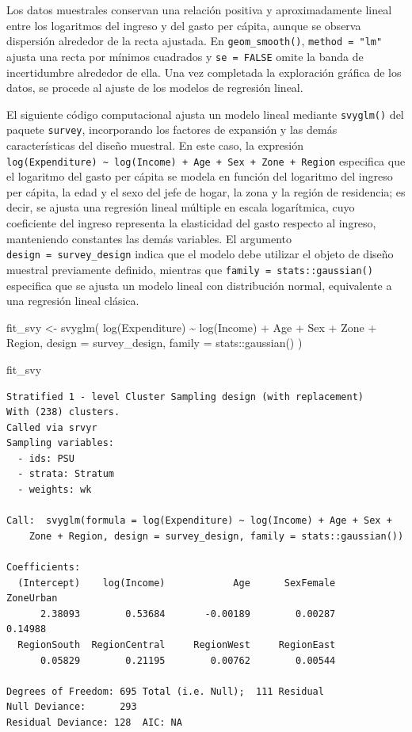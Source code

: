 \documentclass[
  spanish,
  11pt,
  letterpaper,
  oneside,
  open=any]{scrbook}
\newenvironment{Shaded}{\begin{snugshade}}{\end{snugshade}}
\newcommand{\AttributeTok}[1]{\textcolor[rgb]{0.40,0.45,0.13}{#1}}
\newcommand{\FunctionTok}[1]{\textcolor[rgb]{0.28,0.35,0.67}{#1}}
\newcommand{\NormalTok}[1]{\textcolor[rgb]{0.00,0.23,0.31}{#1}}
\newcommand{\OtherTok}[1]{\textcolor[rgb]{0.00,0.23,0.31}{#1}}
\newcommand{\SpecialCharTok}[1]{\textcolor[rgb]{0.37,0.37,0.37}{#1}}
\begin{document}
Los datos muestrales conservan una relación positiva y aproximadamente
lineal entre los logaritmos del ingreso y del gasto per cápita, aunque
se observa dispersión alrededor de la recta ajustada. En
\texttt{geom\_smooth()}, \texttt{method\ =\ "lm"} ajusta una recta por
mínimos cuadrados y \texttt{se\ =\ FALSE} omite la banda de
incertidumbre alrededor de ella. Una vez completada la exploración
gráfica de los datos, se procede al ajuste de los modelos de regresión
lineal.

El siguiente código computacional ajusta un modelo lineal mediante
\texttt{svyglm()} del paquete \texttt{survey}, incorporando los factores
de expansión y las demás características del diseño muestral. En este
caso, la expresión
\texttt{log(Expenditure)\ \textasciitilde{}\ log(Income)\ +\ Age\ +\ Sex\ +\ Zone\ +\ Region}
especifica que el logaritmo del gasto per cápita se modela en función
del logaritmo del ingreso per cápita, la edad y el sexo del jefe de
hogar, la zona y la región de residencia; es decir, se ajusta una
regresión lineal múltiple en escala logarítmica, cuyo coeficiente del
ingreso representa la elasticidad del gasto respecto al ingreso,
manteniendo constantes las demás variables. El argumento
\texttt{design\ =\ survey\_design} indica que el modelo debe utilizar el
objeto de diseño muestral previamente definido, mientras que
\texttt{family\ =\ stats::gaussian()} especifica que se ajusta un modelo
lineal con distribución normal, equivalente a una regresión lineal
clásica.

\begin{Shaded}
\begin{Highlighting}[]
\NormalTok{fit\_svy }\OtherTok{\textless{}{-}} \FunctionTok{svyglm}\NormalTok{(}
  \FunctionTok{log}\NormalTok{(Expenditure) }\SpecialCharTok{\textasciitilde{}} \FunctionTok{log}\NormalTok{(Income) }\SpecialCharTok{+}\NormalTok{ Age }\SpecialCharTok{+}\NormalTok{ Sex }\SpecialCharTok{+}\NormalTok{ Zone }\SpecialCharTok{+}\NormalTok{ Region,}
  \AttributeTok{design =}\NormalTok{ survey\_design,}
  \AttributeTok{family =}\NormalTok{ stats}\SpecialCharTok{::}\FunctionTok{gaussian}\NormalTok{()}
\NormalTok{)}

\NormalTok{fit\_svy}
\end{Highlighting}
\end{Shaded}

\begin{verbatim}
Stratified 1 - level Cluster Sampling design (with replacement)
With (238) clusters.
Called via srvyr
Sampling variables:
  - ids: PSU 
  - strata: Stratum 
  - weights: wk 

Call:  svyglm(formula = log(Expenditure) ~ log(Income) + Age + Sex + 
    Zone + Region, design = survey_design, family = stats::gaussian())

Coefficients:
  (Intercept)    log(Income)            Age      SexFemale      ZoneUrban  
      2.38093        0.53684       -0.00189        0.00287        0.14988  
  RegionSouth  RegionCentral     RegionWest     RegionEast  
      0.05829        0.21195        0.00762        0.00544  

Degrees of Freedom: 695 Total (i.e. Null);  111 Residual
Null Deviance:      293 
Residual Deviance: 128  AIC: NA
\end{verbatim}
\end{document}
